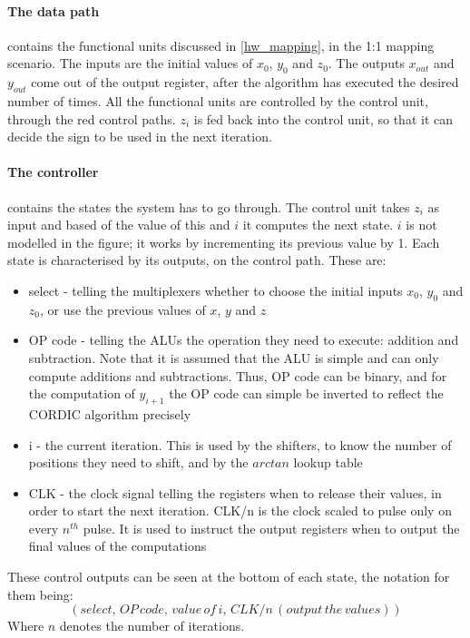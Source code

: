 \documentclass[12pt, a4paper,oneside]{article}
\begin{document}
\paragraph{The data path}
contains the functional units discussed in \ref{hw_mapping}, in the 1:1 mapping
scenario. The inputs are the initial values of $x_0$, $y_0$ and $z_0$. The outputs
$x_{out}$ and $y_{out}$
come out of the output register, after the algorithm has executed the desired
number of times. All the functional units are controlled by the control unit, 
through the red control paths. $z_i$ is fed back into the control unit, 
so that it can decide the sign to be used in the next iteration.

\paragraph{The controller}
contains the states the system has to go through. The control unit takes
$z_i$ as input and based of the value of this and $i$ it computes the next state.
$i$ is not modelled in the figure; it works by incrementing its previous
value by 1. Each state is characterised by its outputs, on the control
path. These are:

\begin{itemize}
	\item select - telling the multiplexers whether to choose the initial 
	inputs  $x_0$, $y_0$ and $z_0$, or use the previous values of 
	$x$, $y$ and $z$
	\item OP code - telling the ALUs the operation they need to execute:
	addition and subtraction. Note that it is assumed that the ALU is simple and can only
	compute additions and subtractions. Thus, OP code can be binary, and for the computation
	of $y_{i+1}$ the OP code can simple be inverted to reflect the CORDIC algorithm precisely
	\item i - the current iteration. This is used by the shifters, to 
	know the number of positions they need to shift, and by the $arctan$
	lookup table
	\item CLK - the clock signal telling the registers when to release their
	values, in order to start the next iteration. CLK/n is the clock scaled
	to pulse only on every $n^{th}$ pulse. It is used to instruct the output registers
	when to output the final values of the computations
\end{itemize}

These control outputs can be seen at the bottom of each state, the notation for them being:
\[(select,\, OP\, code,\, value\, of\, i,\, CLK/n\,(output\, the\, values))\]
Where $n$ denotes the number of iterations.
\end{document}

